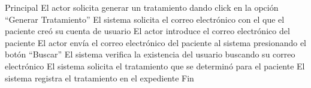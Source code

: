 \begin{UCtrayectoria}{Principal}
	\UCpaso	El actor solicita generar un tratamiento dando click en la opción “Generar Tratamiento”
	\UCpaso El sistema solicita el correo electrónico con el que el paciente creó su cuenta de usuario
	\UCpaso El actor introduce el correo electrónico del paciente
	\UCpaso El actor envía el correo electrónico del paciente al sistema presionando el botón “Buscar”
	\UCpaso El sistema verifica la existencia del usuario buscando su correo electrónico 
	\UCpaso El sistema solicita el tratamiento que se determinó para el paciente
	\UCpaso El sistema registra el tratamiento en el expediente 
	\UCpaso Fin
\end{UCtrayectoria}

